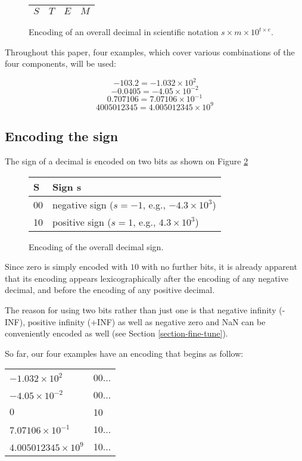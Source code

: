 \documentclass{acm_proc_article-sp}
\begin{document}
\begin{figure}[p]
\caption{Encoding of an overall decimal in scientific notation $s\times m \times10^{t\times e}$.}
\label{figure-overall-encoding}
\center
\begin{tabular}{|l|l|l|l|}
\hline
$S$ & $T$ & $E$ & $M$ \\
\hline
\end{tabular}
\end{figure}

Throughout this paper, four examples, which cover various combinations of the four components, will be used:

$$-103.2 = - 1.032 \times 10^2$$
$$-0.0405 = -4.05 \times 10^{-2}$$
$$0.707106 = 7.07106 \times 10^{-1}$$
$$4005012345 = 4.005012345 \times 10^9$$


\subsection{Encoding the sign}

The sign of a decimal is encoded on two bits as shown on Figure \ref{figure-sign}

\begin{figure}[p]
\caption{Encoding of the overall decimal sign.}
\label{figure-sign}
\center
\begin{tabular}{|l|l|}
\hline
S & Sign s \\
\hline
00 &  negative sign ($s=-1$, e.g., $-4.3\times10^3$)\\
\hline
10 & positive sign ($s=1$, e.g., $4.3\times10^3$)\\
\hline
\end{tabular}
\end{figure}

Since zero is simply encoded with $10$ with no further bits, it is already apparent that its encoding appears lexicographically after the encoding of any negative decimal, and before the encoding of any positive decimal.

The reason for using two bits rather than just one is that negative infinity (-INF), positive infinity (+INF) as well as negative zero and NaN can be conveniently encoded as well (see Section \ref{section-fine-tune}).

So far, our four examples have an encoding that begins as follow:

\begin{tabular}{l|l}
$- 1.032 \times 10^2$ & 00... \\

$-4.05 \times 10^{-2}$ & 00... \\

$0$ & 10 \\

$7.07106 \times 10^{-1}$ & 10... \\

$4.005012345 \times 10^9$ & 10...\\
\end{tabular}
\end{document}
